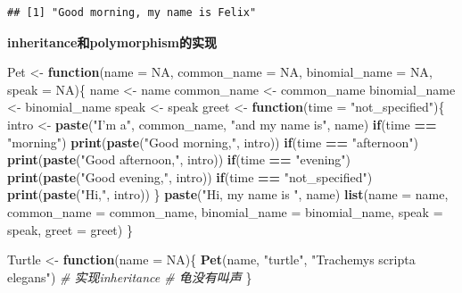 \documentclass[]{book}
\newenvironment{Shaded}{\begin{snugshade}}{\end{snugshade}}
\newcommand{\CommentTok}[1]{\textcolor[rgb]{0.56,0.35,0.01}{\textit{#1}}}
\newcommand{\ControlFlowTok}[1]{\textcolor[rgb]{0.13,0.29,0.53}{\textbf{#1}}}
\newcommand{\DataTypeTok}[1]{\textcolor[rgb]{0.13,0.29,0.53}{#1}}
\newcommand{\KeywordTok}[1]{\textcolor[rgb]{0.13,0.29,0.53}{\textbf{#1}}}
\newcommand{\NormalTok}[1]{#1}
\newcommand{\OperatorTok}[1]{\textcolor[rgb]{0.81,0.36,0.00}{\textbf{#1}}}
\newcommand{\OtherTok}[1]{\textcolor[rgb]{0.56,0.35,0.01}{#1}}
\newcommand{\StringTok}[1]{\textcolor[rgb]{0.31,0.60,0.02}{#1}}
\begin{document}
\begin{verbatim}
## [1] "Good morning, my name is Felix"
\end{verbatim}

\textbf{inheritance和polymorphism的实现}

\begin{Shaded}
\begin{Highlighting}[]
\NormalTok{Pet <-}\StringTok{ }\ControlFlowTok{function}\NormalTok{(}\DataTypeTok{name =} \OtherTok{NA}\NormalTok{, }\DataTypeTok{common_name =} \OtherTok{NA}\NormalTok{, }\DataTypeTok{binomial_name =} \OtherTok{NA}\NormalTok{, }\DataTypeTok{speak =} \OtherTok{NA}\NormalTok{)\{}
\NormalTok{  name <-}\StringTok{ }\NormalTok{name}
\NormalTok{  common_name <-}\StringTok{ }\NormalTok{common_name}
\NormalTok{  binomial_name <-}\StringTok{ }\NormalTok{binomial_name}
\NormalTok{  speak <-}\StringTok{ }\NormalTok{speak}
\NormalTok{  greet <-}\StringTok{ }\ControlFlowTok{function}\NormalTok{(}\DataTypeTok{time =} \StringTok{"not_specified"}\NormalTok{)\{}
\NormalTok{    intro <-}\StringTok{ }\KeywordTok{paste}\NormalTok{(}\StringTok{"I'm a"}\NormalTok{, common_name, }\StringTok{"and my name is"}\NormalTok{, name)}
    \ControlFlowTok{if}\NormalTok{(time }\OperatorTok{==}\StringTok{ "morning"}\NormalTok{) }\KeywordTok{print}\NormalTok{(}\KeywordTok{paste}\NormalTok{(}\StringTok{"Good morning,"}\NormalTok{, intro))}
    \ControlFlowTok{if}\NormalTok{(time }\OperatorTok{==}\StringTok{ "afternoon"}\NormalTok{) }\KeywordTok{print}\NormalTok{(}\KeywordTok{paste}\NormalTok{(}\StringTok{"Good afternoon,"}\NormalTok{, intro))}
    \ControlFlowTok{if}\NormalTok{(time }\OperatorTok{==}\StringTok{ "evening"}\NormalTok{) }\KeywordTok{print}\NormalTok{(}\KeywordTok{paste}\NormalTok{(}\StringTok{"Good evening,"}\NormalTok{, intro)) }
    \ControlFlowTok{if}\NormalTok{(time }\OperatorTok{==}\StringTok{ "not_specified"}\NormalTok{) }\KeywordTok{print}\NormalTok{(}\KeywordTok{paste}\NormalTok{(}\StringTok{"Hi,"}\NormalTok{, intro))}
\NormalTok{  \}}
    \KeywordTok{paste}\NormalTok{(}\StringTok{"Hi, my name is "}\NormalTok{, name)}
  \KeywordTok{list}\NormalTok{(}\DataTypeTok{name =}\NormalTok{ name, }\DataTypeTok{common_name =}\NormalTok{ common_name, }\DataTypeTok{binomial_name =}\NormalTok{ binomial_name, }\DataTypeTok{speak =}\NormalTok{ speak, }\DataTypeTok{greet =}\NormalTok{ greet)}
\NormalTok{\}}


\NormalTok{Turtle <-}\StringTok{ }\ControlFlowTok{function}\NormalTok{(}\DataTypeTok{name =} \OtherTok{NA}\NormalTok{)\{}
  \KeywordTok{Pet}\NormalTok{(name, }\StringTok{"turtle"}\NormalTok{, }\StringTok{"Trachemys scripta elegans"}\NormalTok{) }\CommentTok{# 实现inheritance # 龟没有叫声}
\NormalTok{\}}


\end{Highlighting}
\end{Shaded}
\end{document}
